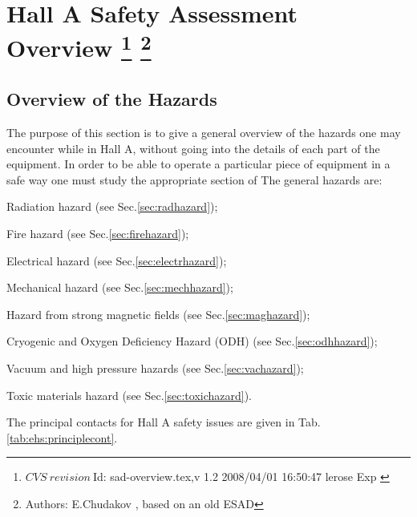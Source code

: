\chapter[Hall A Safety Assessment Overview]{Hall A Safety Assessment Overview
\footnote{
  $CVS~revision~ $Id: sad-overview.tex,v 1.2 2008/04/01 16:50:47 lerose Exp $ $ 
}
\footnote{Authors: E.Chudakov , based on an old ESAD}
}
 
\begin{safetyen}{10}{15}
\section{Overview of the Hazards} 
\end{safetyen}
\label{sec:overviewhazards}

The purpose of this section is to give a general overview of the hazards one may encounter
while in Hall A,
without going into the details of each part of the equipment. In order to 
be able to operate a particular piece of equipment in a safe way one must study the appropriate
section of  
The general hazards are:
\begin{list}{.~}{\setlength{\itemsep}{-0.15cm}}
  \item Radiation hazard (see Sec.\ref{sec:radhazard});
  \item Fire hazard (see Sec.\ref{sec:firehazard});
  \item Electrical hazard (see Sec.\ref{sec:electrhazard});
  \item Mechanical hazard (see Sec.\ref{sec:mechhazard});
  \item Hazard from strong magnetic fields (see Sec.\ref{sec:maghazard});
  \item Cryogenic and Oxygen Deficiency Hazard (ODH) (see Sec.\ref{sec:odhhazard});
  \item Vacuum and high pressure hazards  (see Sec.\ref{sec:vachazard});
  \item Toxic materials hazard  (see Sec.\ref{sec:toxichazard}).
\end{list}

The principal contacts for Hall A safety issues are given in Tab.\ref{tab:ehs:principlecont}.
 
